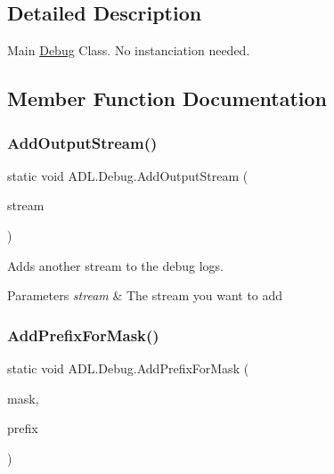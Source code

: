 \subsection{Detailed Description}
Main \mbox{\hyperlink{class_a_d_l_1_1_debug}{Debug}} Class. No instanciation needed. 



\subsection{Member Function Documentation}
\mbox{\label{class_a_d_l_1_1_debug_a86b5d2f65724ee112ee9c911f9ce46ae}} 
\subsubsection{\texorpdfstring{Add\+Output\+Stream()}{AddOutputStream()}}
{\footnotesize\ttfamily static void A\+D\+L.\+Debug.\+Add\+Output\+Stream (\begin{DoxyParamCaption}\item[{\mbox{\hyperlink{class_a_d_l_1_1_log_stream}{Log\+Stream}}}]{stream }\end{DoxyParamCaption})\hspace{0.3cm}{\ttfamily [static]}}



Adds another stream to the debug logs. 


\begin{DoxyParams}{Parameters}
{\em stream} & The stream you want to add\\
\hline
\end{DoxyParams}
\mbox{\label{class_a_d_l_1_1_debug_abec71a3a9db52f919e4ba93b6b9842e2}} 
\subsubsection{\texorpdfstring{Add\+Prefix\+For\+Mask()}{AddPrefixForMask()}}
{\footnotesize\ttfamily static void A\+D\+L.\+Debug.\+Add\+Prefix\+For\+Mask (\begin{DoxyParamCaption}\item[{int}]{mask,  }\item[{string}]{prefix }\end{DoxyParamCaption})\hspace{0.3cm}{\ttfamily [static]}}



